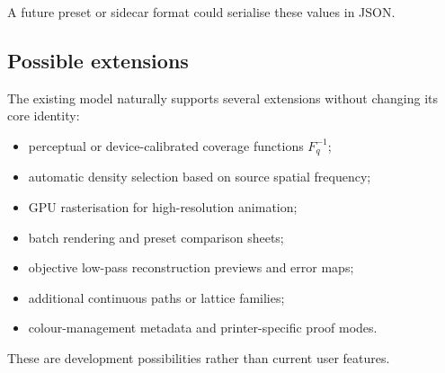 A future preset or sidecar format could serialise these values in JSON.

\subsection{Possible extensions}

The existing model naturally supports several extensions without changing its core identity:

\begin{itemize}
  \item perceptual or device-calibrated coverage functions $F_q^{-1}$;
  \item automatic density selection based on source spatial frequency;
  \item GPU rasterisation for high-resolution animation;
  \item batch rendering and preset comparison sheets;
  \item objective low-pass reconstruction previews and error maps;
  \item additional continuous paths or lattice families;
  \item colour-management metadata and printer-specific proof modes.
\end{itemize}

These are development possibilities rather than current user features.

\clearpage
